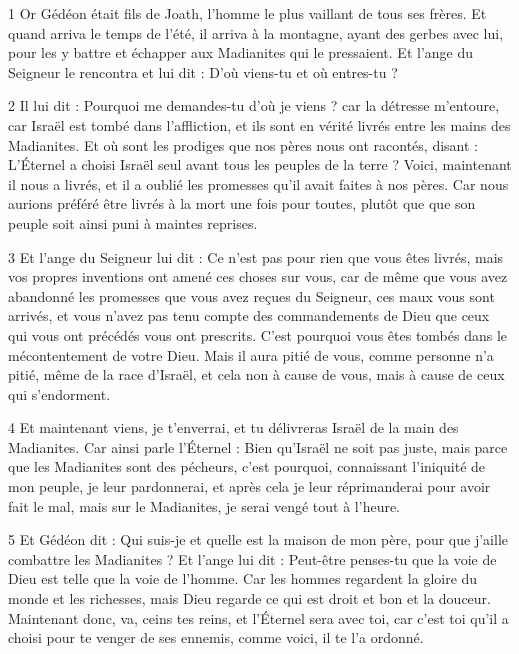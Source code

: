 \par 1 Or Gédéon était fils de Joath, l'homme le plus vaillant de tous ses frères. Et quand arriva le temps de l'été, il arriva à la montagne, ayant des gerbes avec lui, pour les y battre et échapper aux Madianites qui le pressaient. Et l'ange du Seigneur le rencontra et lui dit : D'où viens-tu et où entres-tu ?

\par 2 Il lui dit : Pourquoi me demandes-tu d'où je viens ? car la détresse m'entoure, car Israël est tombé dans l'affliction, et ils sont en vérité livrés entre les mains des Madianites. Et où sont les prodiges que nos pères nous ont racontés, disant : L'Éternel a choisi Israël seul avant tous les peuples de la terre ? Voici, maintenant il nous a livrés, et il a oublié les promesses qu'il avait faites à nos pères. Car nous aurions préféré être livrés à la mort une fois pour toutes, plutôt que que son peuple soit ainsi puni à maintes reprises.

\par 3 Et l'ange du Seigneur lui dit : Ce n'est pas pour rien que vous êtes livrés, mais vos propres inventions ont amené ces choses sur vous, car de même que vous avez abandonné les promesses que vous avez reçues du Seigneur, ces maux vous sont arrivés, et vous n'avez pas tenu compte des commandements de Dieu que ceux qui vous ont précédés vous ont prescrits. C’est pourquoi vous êtes tombés dans le mécontentement de votre Dieu. Mais il aura pitié de vous, comme personne n'a pitié, même de la race d'Israël, et cela non à cause de vous, mais à cause de ceux qui s'endorment.

\par 4 Et maintenant viens, je t'enverrai, et tu délivreras Israël de la main des Madianites. Car ainsi parle l'Éternel : Bien qu'Israël ne soit pas juste, mais parce que les Madianites sont des pécheurs, c'est pourquoi, connaissant l'iniquité de mon peuple, je leur pardonnerai, et après cela je leur réprimanderai pour avoir fait le mal, mais sur le Madianites, je serai vengé tout à l'heure.

\par 5 Et Gédéon dit : Qui suis-je et quelle est la maison de mon père, pour que j'aille combattre les Madianites ? Et l'ange lui dit : Peut-être penses-tu que la voie de Dieu est telle que la voie de l'homme. Car les hommes regardent la gloire du monde et les richesses, mais Dieu regarde ce qui est droit et bon et la douceur. Maintenant donc, va, ceins tes reins, et l'Éternel sera avec toi, car c'est toi qu'il a choisi pour te venger de ses ennemis, comme voici, il te l'a ordonné.

